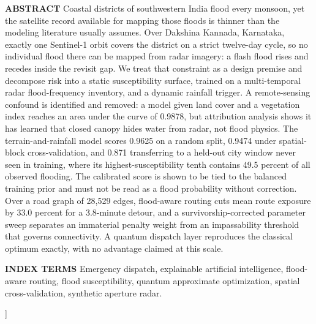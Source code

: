 \documentclass[10pt,twocolumn]{article}
\begin{document}
\begin{@twocolumnfalse}
\begin{minipage}{\dimexpr\textwidth-0.958in\relax}
{\fontsize{10}{12}\selectfont
{\helv\bfseries\color{accessblue}ABSTRACT }Coastal districts of southwestern India flood every monsoon, yet the satellite record available for mapping those floods is thinner than the modeling literature usually assumes. Over Dakshina Kannada, Karnataka, exactly one Sentinel-1 orbit covers the district on a strict twelve-day cycle, so no individual flood there can be mapped from radar imagery: a flash flood rises and recedes inside the revisit gap. We treat that constraint as a design premise and decompose risk into a static susceptibility surface, trained on a multi-temporal radar flood-frequency inventory, and a dynamic rainfall trigger. A remote-sensing confound is identified and removed: a model given land cover and a vegetation index reaches an area under the curve of 0.9878, but attribution analysis shows it has learned that closed canopy hides water from radar, not flood physics. The terrain-and-rainfall model scores 0.9625 on a random split, 0.9474 under spatial-block cross-validation, and 0.871 transferring to a held-out city window never seen in training, where its highest-susceptibility tenth contains 49.5 percent of all observed flooding. The calibrated score is shown to be tied to the balanced training prior and must not be read as a flood probability without correction. Over a road graph of 28,529 edges, flood-aware routing cuts mean route exposure by 33.0 percent for a 3.8-minute detour, and a survivorship-corrected parameter sweep separates an immaterial penalty weight from an impassability threshold that governs connectivity. A quantum dispatch layer reproduces the classical optimum exactly, with no advantage claimed at this scale.\par}

\vspace{9pt}

{\fontsize{10}{12}\selectfont\raggedright
{\helv\bfseries\color{accessblue}INDEX TERMS }Emergency dispatch, explainable artificial intelligence, flood-aware routing, flood susceptibility, quantum approximate optimization, spatial cross-validation, synthetic aperture radar.\par}
\end{minipage}

\vspace{16pt}
\end{@twocolumnfalse}
]
\end{document}
